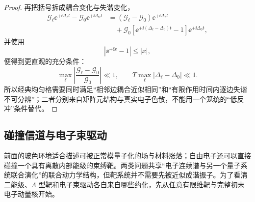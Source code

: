 \begin{proof}
再把括号拆成耦合变化与失谐变化，
\begin{align*}
\mathcal G_\ell\ee^{+\ii\Delta_\ell t}
-\mathcal G_0\ee^{+\ii\Delta_0t}
&=
(\mathcal G_\ell-\mathcal G_0)\ee^{+\ii\Delta_\ell t}\\
&\quad+
\mathcal G_0
\left[
\ee^{+\ii(\Delta_\ell-\Delta_0)t}-1
\right]
\ee^{+\ii\Delta_0t},
\end{align*}
并使用
\[
|\ee^{+\ii x}-1|
\le|x|,
\]
便得到更直观的充分条件：
\[
\max_\ell
\left|
\frac{\mathcal G_\ell-\mathcal G_0}{\mathcal G_0}
\right|
\ll1,
\qquad
T\max_\ell|\Delta_\ell-\Delta_0|
\ll1.
\]
所以经典均匀格需要同时满足“相邻边耦合近似相同”和“有限作用时间内逐边失谐不可分辨”；二者分别来自矩阵元结构与真实电子色散，不能用一个笼统的“低反冲”条件替代。
\end{proof}


\subsection{碰撞信道与电子束驱动}\label{sec:collision-channel-beam-dp19}\label{subsec:single-electron-collision-dp19}

前面的玻色环境适合描述可被正常模量子化的场与材料涨落；自由电子还可以直接碰撞一个具有离散内部能级的束缚靶。两类问题共享“电子连续谱与另一个量子系统联合演化”的联合动力学结构，但靶系统并不需要先被近似成谐振子。为了看清二能级、$\Lambda$ 型靶和电子束驱动各自来自哪些约化，先从任意有限维靶与完整初末电子动量核开始。


